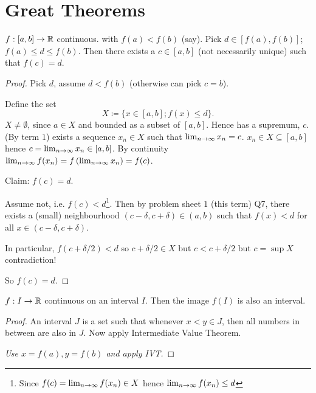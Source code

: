 \section{Great Theorems}
\begin{theorem}\label{thm:IVT}
    $f : [a, b] \to \mathbb{R}$ continuous.
    with $f(a) < f(b)$
    (say).
    Pick $d \in [f(a), f(b)]$;
    $f(a) \leq d \leq f(b)$.
    Then there exists a $c \in [a, b]$
    (not necessarily unique)
    such that $f(c) = d$.
\end{theorem}
\begin{proof}
    Pick $d$,
    assume $d < f(b)$
    (otherwise can pick $c = b$).
    
    Define the set
    \[
    X \coloneqq \{x \in [a, b]; f(x) \leq d\}.
    \]
    $X \neq \emptyset$,
    since $a \in X$ and bounded as a subset of $[a, b]$.
    Hence has a supremum,
    $c$.
    (By term $1$)
    exists a sequence $x_n \in X$ such that $\lim_{n \rightarrow \infty} x_n = c$.
    $x_n \in X \subseteq [a, b]$ hence $c = \lim_{n \rightarrow \infty} x_n \in [a, b]$.
    By continuity $\lim_{n \rightarrow \infty} f(x_n) = f\left(\lim_{n \rightarrow \infty} x_n\right) = f(c)$.

    Claim:
    $f(c) = d$.

    Assume not,
    i.e. $f(c) < d$\footnote{Since $f(c) = \lim_{n \rightarrow \infty} f(x_n) \in X$ hence $\lim_{n \rightarrow \infty} f(x_n) \leq d$}.
    Then by problem sheet $1$
    (this term)
    Q7,
    there exists a
    (small)
    neighbourhood $(c - \delta, c + \delta) \in (a, b)$ such that $f(x) < d$ for all $x \in (c - \delta, c + \delta)$.

    In particular, $f(c + \delta / 2) < d$ so $c + \delta / 2 \in X$
    but $c < c + \delta / 2$ but $c = \sup{X}$ contradiction!

    So $f(c) =  d$.
\end{proof}

\begin{corollary}\label{cor:IVT_imagecont}
    $f : I \to \mathbb{R}$ continuous on an interval $I$.
    Then the image $f(I)$ is also an interval.
\end{corollary}
\begin{proof}
    An interval $J$ is a set such that whenever $x < y \in J$,
    then all numbers in between are also in $J$.
    Now apply Intermediate Value Theorem.

    \textit{Use $x = f(a), y = f(b)$ and apply IVT.}
\end{proof}

